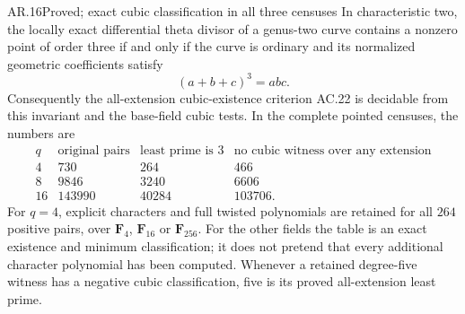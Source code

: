 \begin{claim}{AR.16}{Proved; exact cubic classification in all three censuses}
In characteristic two, the locally exact differential theta divisor
of a genus-two curve contains a nonzero point of order three
if and only if the curve is ordinary and its normalized geometric
coefficients satisfy
\[
                         (a+b+c)^3=abc.
\]
Consequently the all-extension cubic-existence criterion AC.22
is decidable from this invariant and the base-field cubic tests.
In the complete pointed censuses, the numbers are
\[
\begin{array}{c|r|r|r}
q&\text{original pairs}&\text{least prime is }3&
   \text{no cubic witness over any extension}\\\hline
4&730&264&466\\
8&9846&3240&6606\\
16&143990&40284&103706.
\end{array}
\]
For $q=4$, explicit characters and full twisted polynomials are
retained for all $264$ positive pairs, over $\mathbf F_4$,
$\mathbf F_{16}$ or $\mathbf F_{256}$. For the other fields the
table is an exact existence and minimum classification; it does
not pretend that every additional character polynomial has been
computed. Whenever a retained degree-five witness has a negative
cubic classification, five is its proved all-extension least prime.
\end{claim}
